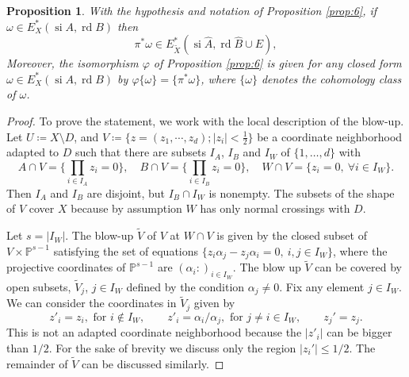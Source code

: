 \documentclass[11pt,a4paper]{amsart}
\renewcommand{\P}{\mathds{P}}
\DeclareMathOperator{\si}{si}
\DeclareMathOperator{\rd}{rd}
\numberwithin{equation}{section}
\theoremstyle{plain}
\newtheorem{prop}{Proposition}[section]
\theoremstyle{definition}
\begin{document}
\begin{prop}\label{prop:5} With the hypothesis and notation of
  Proposition \ref{prop:6},  if $\omega\in E_{X}^\ast(\si A,\rd B)$ then
  \begin{displaymath}
    \pi ^\ast\omega \in E_{\widetilde X}^\ast(\si \widehat A,\rd \widehat B\cup E),
  \end{displaymath}
  Moreover, the isomorphism $\varphi $ of Proposition \ref{prop:6} is
  given for any closed form $\omega \in E_{X}^\ast(\si A,\rd B)$ by
  $\varphi\{\omega\}=\{\pi ^{\ast}\omega\}$, where $\{\omega\}$
  denotes the cohomology class of $\omega$.
\end{prop}
\begin{proof}
  To prove the statement, we work with the local description of the
  blow-up. Let $U\coloneqq X\setminus D$, and
  $V\coloneqq \{z=(z_{1},\cdots , z_{d}); |z_{i}|< \frac{1}{2}\}$ be a
  coordinate neighborhood adapted to $D$ such that there are subsets
  $I_{A}$, $I_{B}$ and 
  $I_{W}$ of $\{1,\dots,d\}$ with 
  \begin{displaymath}
    A\cap V=\{ \prod_{i\in I_{A}} z_{i}=0\},\quad
    B\cap V=\{ \prod_{i\in I_{B}} z_{i}=0\},\quad
    W\cap V=\{ z_{i}=0,\ \forall i\in I_{W}\}.
  \end{displaymath}
  Then $I_{A}$ and $I_{B}$ are disjoint, but $I_{B}\cap I_{W}$ is
  nonempty. The subsets of the shape of $V$ cover $X$ because by
  assumption $W$ has only 
  normal crossings with $D$.

  Let $s=|I_{W}|$. The blow-up
  $\widetilde{V}$ of $V$ at $W\cap V$ is given by the closed subset of
  $V\times \P^{s-1}$ satisfying the set of equations
  $\{z_{i}\alpha_{j}-z_{j}\alpha_{i}=0, \ i,j\in I_{W}\}$,
  where the projective coordinates of $\P^{s-1}$ are
  $(\alpha_{i}\colon)_{i\in I_{W}}$. The blow up $\widetilde V$ can
  be covered by open subsets, $\widetilde V_{j}$, $j\in I_{W}$ defined by the
  condition $\alpha _{j}\not =0$. Fix any element $j\in I_{W}$. We can
  consider the coordinates in $\widetilde V_{j}$ given by
  \begin{displaymath}
    z'_{i}=z_{i}, \text{ for }i\not \in I_{W}, \qquad z'_{i}=\alpha
    _{i}/\alpha _{j}, \text{ for }j\not = i \in I_{W},\qquad z_{j}'=z_{j}.
  \end{displaymath}
  This is not an adapted coordinate neighborhood because the $|z'_{i}|$
  can be bigger than $1/2$. For the sake of brevity we discuss only
  the region $|z_{i}'|\le 1/2$. The remainder of $\widetilde V$ can be
  discussed similarly.
  

\end{proof}
\end{document}
